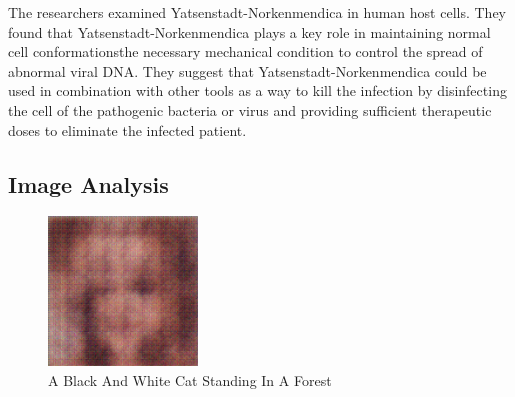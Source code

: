 \documentclass{article}%
\begin{document}
The researchers examined Yatsenstadt{-}Norkenmendica in human host cells. They found that Yatsenstadt{-}Norkenmendica plays a key role in maintaining normal cell conformationsthe necessary mechanical condition to control the spread of abnormal viral DNA. They suggest that Yatsenstadt{-}Norkenmendica could be used in combination with other tools as a way to kill the infection by disinfecting the cell of the pathogenic bacteria or virus and providing sufficient therapeutic doses to eliminate the infected patient.

%
\subsection{Image Analysis}%
\label{subsec:ImageAnalysis}%


\begin{figure}[h!]%
\centering%
\includegraphics[width=150px]{500_fake_images/samples_5_348.png}%
\caption{A Black And White Cat Standing In A Forest}%
\end{figure}

%
\end{document}
